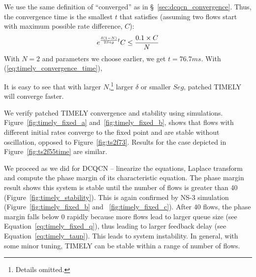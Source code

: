 We use the same definition of ``converged'' as in
\S~\ref{sec:dcqcn_convergence}. Thus, the convergence
time is the smallest $t$ that satisfies (assuming two flows start with maximum possible rate difference, $C$):
\begin{equation}
\small
{e^{\frac{{\delta (1 - N)}}{{2Seg}}t}}C \le \frac{{0.1 \times C}}{N}
\label{eq:timely_convergence_time}
\end{equation}
With $N=2$ and parameters we choose earlier, we get $t = 76.7ms$. With (\ref{eq:timely_convergence_time}), 

It is easy to see that
with larger $N$,\footnote{Details omitted.} larger $\delta$ or smaller $Seg$, patched TIMELY will converge faster.

\fi

We verify patched TIMELY convergence and stability using simulations.
Figure~\ref{fig:timely_fixed_a} and~\ref{fig:timely_fixed_b}, shows that flows
with different initial rates converge to the fixed point and are stable without
oscillation, opposed to Figure~\ref{fig:ts2f73}. Results for the case depicted
in Figure~\ref{fig:ts2f55time} are similar.

 We proceed as we did for DCQCN -- linearize the equations,
Laplace transform and compute the phase margin of its characteristic equation.
The phase margin result shows this system is stable until the number of flows is
greater than 40 (Figure~\ref{fig:timely_stability}).  This is again confirmed by
NS-3 simulation (Figure~\ref{fig:timely_fixed_b} and ~\ref{fig:timely_fixed_c}).
After 40 flows, the phase margin falls below 0 rapidly because more flows lead
to larger queue size (see Equation~\ref{eq:timely_fixed_q}), thus leading to
larger feedback delay (see Equation~\ref{eq:timely_taup}).  This leads to system
instability. In general, with some minor tuning, TIMELY can be stable within a
range of number of flows.
